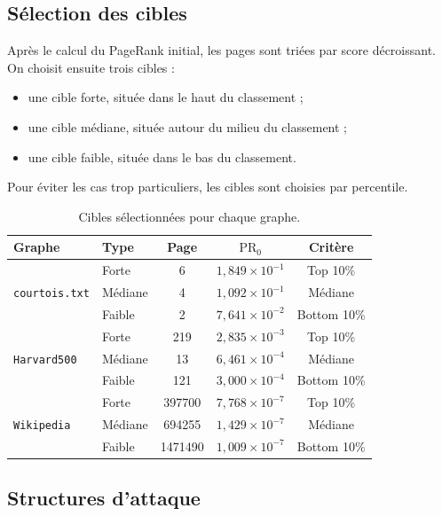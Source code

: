 \documentclass[12pt,a4paper]{article}
\newcommand{\PR}{\mathrm{PR}}
\theoremstyle{definition}
\begin{document}
\subsection{Sélection des cibles}

Après le calcul du PageRank initial, les pages sont triées par score décroissant.
On choisit ensuite trois cibles :
\begin{itemize}[noitemsep]
    \item une cible forte, située dans le haut du classement ;
    \item une cible médiane, située autour du milieu du classement ;
    \item une cible faible, située dans le bas du classement.
\end{itemize}

Pour éviter les cas trop particuliers, les cibles sont choisies par percentile.

\begin{table}[H]
\centering
\caption{Cibles sélectionnées pour chaque graphe.}
\label{tab:cibles}
\small
\begin{tabular}{llccc}
\toprule
\textbf{Graphe} & \textbf{Type} & \textbf{Page} & \textbf{$\PR_0$} & \textbf{Critère} \\
\midrule
\multirow{3}{*}{\texttt{courtois.txt}}
 & Forte   & 6  & $1{,}849 \times 10^{-1}$ & Top 10\% \\
 & Médiane & 4  & $1{,}092 \times 10^{-1}$ & Médiane \\
 & Faible  & 2  & $7{,}641 \times 10^{-2}$ & Bottom 10\% \\
\midrule
\multirow{3}{*}{\texttt{Harvard500}}
 & Forte   & 219 & $2{,}835 \times 10^{-3}$ & Top 10\% \\
 & Médiane & 13  & $6{,}461 \times 10^{-4}$ & Médiane \\
 & Faible  & 121 & $3{,}000 \times 10^{-4}$ & Bottom 10\% \\
\midrule
\multirow{3}{*}{\texttt{Wikipedia}}
 & Forte   & 397700  & $7{,}768 \times 10^{-7}$ & Top 10\% \\
 & Médiane & 694255  & $1{,}429 \times 10^{-7}$ & Médiane \\
 & Faible  & 1471490 & $1{,}009 \times 10^{-7}$ & Bottom 10\% \\
\bottomrule
\end{tabular}
\end{table}

\subsection{Structures d'attaque}
\end{document}
